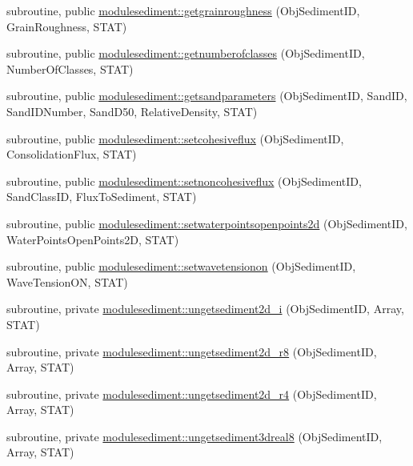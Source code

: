 \begin{DoxyCompactItemize}
\item 
subroutine, public \mbox{\hyperlink{namespacemodulesediment_ac873ffbc4a1e0467d82815aeb2ad34cc}{modulesediment\+::getgrainroughness}} (Obj\+Sediment\+ID, Grain\+Roughness, S\+T\+AT)
\item 
subroutine, public \mbox{\hyperlink{namespacemodulesediment_a1b6836cb590222a61d3ec36961ce22c2}{modulesediment\+::getnumberofclasses}} (Obj\+Sediment\+ID, Number\+Of\+Classes, S\+T\+AT)
\item 
subroutine, public \mbox{\hyperlink{namespacemodulesediment_a283894d1d09fefa91f63082646eea486}{modulesediment\+::getsandparameters}} (Obj\+Sediment\+ID, Sand\+ID, Sand\+I\+D\+Number, Sand\+D50, Relative\+Density, S\+T\+AT)
\item 
subroutine, public \mbox{\hyperlink{namespacemodulesediment_ab6753fbc97e7e46e60797defc442a36e}{modulesediment\+::setcohesiveflux}} (Obj\+Sediment\+ID, Consolidation\+Flux, S\+T\+AT)
\item 
subroutine, public \mbox{\hyperlink{namespacemodulesediment_ad60212253ba034e9fe1db4ab0c2c8442}{modulesediment\+::setnoncohesiveflux}} (Obj\+Sediment\+ID, Sand\+Class\+ID, Flux\+To\+Sediment, S\+T\+AT)
\item 
subroutine, public \mbox{\hyperlink{namespacemodulesediment_a8c48bc8f4d2f029c54181f59654feaa5}{modulesediment\+::setwaterpointsopenpoints2d}} (Obj\+Sediment\+ID, Water\+Points\+Open\+Points2D, S\+T\+AT)
\item 
subroutine, public \mbox{\hyperlink{namespacemodulesediment_a7549a71a1a07687cb5225c5c8441cb72}{modulesediment\+::setwavetensionon}} (Obj\+Sediment\+ID, Wave\+Tension\+ON, S\+T\+AT)
\item 
subroutine, private \mbox{\hyperlink{namespacemodulesediment_a12b3d28230917a2bca4471c82f39bdab}{modulesediment\+::ungetsediment2d\+\_\+i}} (Obj\+Sediment\+ID, Array, S\+T\+AT)
\item 
subroutine, private \mbox{\hyperlink{namespacemodulesediment_aea72603e1507bed2899b17d9e29b67c9}{modulesediment\+::ungetsediment2d\+\_\+r8}} (Obj\+Sediment\+ID, Array, S\+T\+AT)
\item 
subroutine, private \mbox{\hyperlink{namespacemodulesediment_af3fda7dbc66fbbecc4cf8ca7d4fdf95d}{modulesediment\+::ungetsediment2d\+\_\+r4}} (Obj\+Sediment\+ID, Array, S\+T\+AT)
\item 
subroutine, private \mbox{\hyperlink{namespacemodulesediment_abf1b5c58352a7fda2565c80929e6e099}{modulesediment\+::ungetsediment3dreal8}} (Obj\+Sediment\+ID, Array, S\+T\+AT)
\item 

\end{DoxyCompactItemize}
